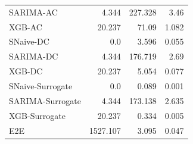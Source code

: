 \begin{longtable}{lrrr}
SARIMA-AC & 4.344 & 227.328 & 3.46 \\
XGB-AC & 20.237 & 71.09 & 1.082 \\
SNaive-DC & 0.0 & 3.596 & 0.055 \\
SARIMA-DC & 4.344 & 176.719 & 2.69 \\
XGB-DC & 20.237 & 5.054 & 0.077 \\
SNaive-Surrogate & 0.0 & 0.089 & 0.001 \\
SARIMA-Surrogate & 4.344 & 173.138 & 2.635 \\
XGB-Surrogate & 20.237 & 0.334 & 0.005 \\
E2E & 1527.107 & 3.095 & 0.047 \\
\end{longtable}
\endgroup
